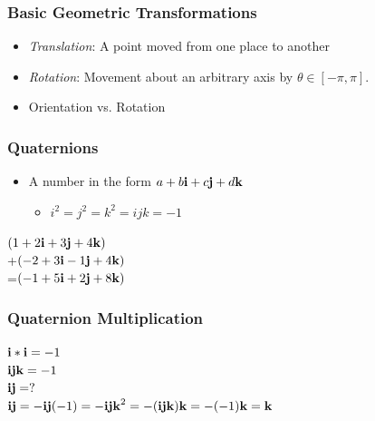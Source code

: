 \documentclass[serif,mathserif]{beamer}
\newcommand{\qi}{\text{\textbf{i}}}
\newcommand{\qj}{\text{\textbf{j}}}
\newcommand{\qk}{\text{\textbf{k}}}
\begin{document}
\begin{frame} 
  \frametitle{Basic Geometric Transformations}
  \begin{itemize}
  \item 
  \textit{Translation}: A point moved from one place to another \pause
  \item \textit{Rotation}: Movement about an arbitrary axis by $\theta \in [-\pi,\pi]$.\pause
  \item Orientation vs. Rotation 
    
  \end{itemize}
\end{frame}



\begin{frame}
  \frametitle{Quaternions}
  \begin{itemize}
    \item A number in the form $a + b\qi + c\qj + d\qk $
    \begin{itemize}
        \item $i^2 = j^2 = k^2 = ijk = -1$
    \end{itemize}
    \end{itemize}
    \centering
  \vspace{0.3cm}    
      $(1 + 2\qi + 3\qj + 4\qk)$ \\
     +$(-2 + 3\qi - 1\qj + 4\qk)$\\
     =$(-1 + 5\qi + 2\qj + 8\qk)$

\end{frame}


\begin{frame}
  \frametitle{Quaternion Multiplication}
  \centering
   $\qi * \qi = -1$ \\
   $\qi\qj\qk = -1$ \\ \pause
   $\qi\qj = ? $ \\ \pause
   $\qi\qj = -\qi\qj (-1) = - \qi\qj\qk^2= -(\qi\qj\qk)\qk = -(-1)\qk = \qk $ 
\end{frame}
\end{document}
